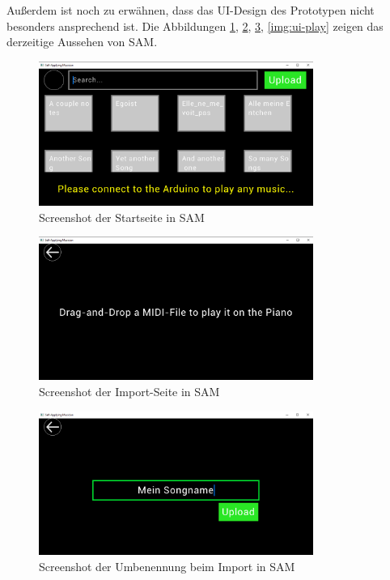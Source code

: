 Außerdem ist noch zu erwähnen, dass das \ac{UI}-Design des Prototypen nicht besonders ansprechend ist.
Die Abbildungen \ref{img:ui-start}, \ref{img:ui-dnd}, \ref{img:ui-rename}, \ref{img:ui-play} zeigen das derzeitige Aussehen von \ac{SAM}.

\begin{figure}[htbp]
	\centering
	\includegraphics*[width=0.8\textwidth]{img/ui-start}
	\caption{Screenshot der Startseite in \ac{SAM}}
	\label{img:ui-start}
\end{figure}

\begin{figure}[htbp]
	\centering
	\includegraphics*[width=0.8\textwidth]{img/ui-dnd}
	\caption{Screenshot der Import-Seite in \ac{SAM}}
	\label{img:ui-dnd}
\end{figure}

\begin{figure}[htbp]
	\centering
	\includegraphics*[width=0.8\textwidth]{img/ui-rename}
	\caption{Screenshot der Umbenennung beim Import in \ac{SAM}}
	\label{img:ui-rename}
\end{figure}

